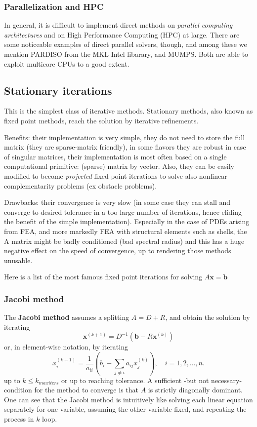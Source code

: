 \documentclass{digitaldynamics}
\def\vect#1{\bm{#1}}
\def\matr#1{{#1}}
\begin{document}
\subsubsection{Parallelization and HPC}

In general, it is difficult to implement direct methods on\textit{ parallel computing architectures} and on High Performance Computing (HPC) at large. There are some noticeable examples of direct parallel solvers, though, and among these we mention PARDISO from the MKL Intel libarary, and MUMPS. Both are able to exploit multicore CPUs to a good extent.


\subsection{Stationary iterations}

This is the simplest class of iterative methods. Stationary methods, also known as fixed point methods, reach the solution by iterative refinements. 

Benefits: 
their implementation is very simple, 
they do not need to store the full matrix (they are sparse-matrix friendly),
in some flavors they are robust in case of singular matrices,
their implementation is most often based on a single computational primitive: (sparse) matrix by vector. 
Also, they can be easily modified to become \textit{projected} fixed point iterations to solve also nonlinear complementarity problems (ex obstacle problems).

Drawbacks: 
their convergence is very slow (in some case they can stall and converge to desired tolerance in a too large number of iterations, hence eliding the benefit of the simple implementation). Especially in the case of PDEs arising from FEA, and more markedly FEA with structural elements such as shells, the A matrix might be badly conditioned (bad spectral radius) and this has a huge negative effect on the speed of convergence, up to rendering those methods unusable.

Here is a list of the most famous fixed point iterations for solving $\matr{A} \vect{x} = \vect{b}$

\subsubsection{Jacobi method}

The \textbf{Jacobi method} assumes a splitting $\matr{A}=\matr{D}+ \matr{R}$, and obtain the solution by iterating 
\[
\vect{x}^{(k+1)} = D^{-1} (\vect{b} - R \vect{x}^{(k)})
\]
or, in element-wise notation, by iterating 
\[
x^{(k+1)}_i  = \frac{1}{a_{ii}} \left(b_i -\sum_{j\ne i}a_{ij}x^{(k)}_j\right),\quad i=1,2,\ldots,n.
\]
up to $k \leq k_{max iters}$ or up to reaching tolerance.
A sufficient -but not necessary- condition for the method to converge is that $\matr{A}$ is strictly diagonally dominant. 
One can see that the Jacobi method is intuitively like solving each linear equation separately for one variable, assuming the other variable fixed, and repeating the process in $k$ loop.
\end{document}
